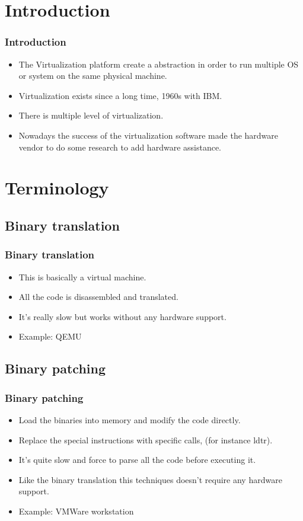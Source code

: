 

\section{Introduction}
\begin{frame}
\frametitle{Introduction}
\begin{itemize}
\item The Virtualization platform create a abstraction in order to run multiple OS or system on the same physical machine.
\item Virtualization exists since a long time, 1960s with IBM.
\item There is multiple level of virtualization.
\item Nowadays the success of the virtualization software made the hardware vendor to do some research to add hardware assistance.
\end{itemize}
\end{frame}

\section{Terminology}
\subsection{Binary translation}
\begin{frame}
\frametitle{Binary translation}
\begin{itemize}
\item This is basically a virtual machine.
\item All the code is disassembled and translated.
\item It's really slow but works without any hardware support.
\item Example: QEMU
\end{itemize}
\end{frame}

\subsection{Binary patching}
\begin{frame}
\frametitle{Binary patching}
\begin{itemize}
  \item Load the binaries into memory and modify the code directly.
  \item Replace the special instructions with specific calls, (for instance ldtr).
  \item It's quite slow and force to parse all the code before executing
  it.
  \item Like the binary translation this techniques doesn't require any hardware support.
  \item Example: VMWare workstation
\end{itemize}
\end{frame}

